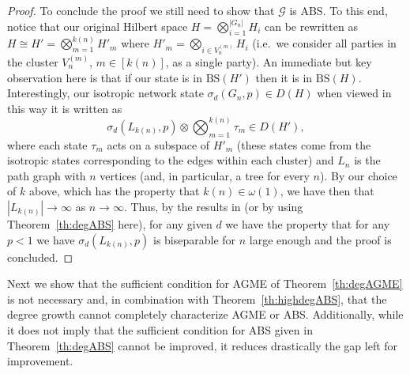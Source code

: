 \documentclass[a4paper,onecolumn,accepted=2024-12-14]{quantumarticle}
\theoremstyle{plain}
\newcommand{\cG}{{\mathcal G}}         %
\begin{document}
\begin{proof}
To conclude the proof we still need to show that $\cG$ is ABS. To this end, notice that our original Hilbert space $H=\bigotimes_{i=1}^{|G_n|} H_i$ can be rewritten as $H\cong H'=\bigotimes_{m=1}^{k(n)} H'_m$ where $H'_m=\bigotimes_{i\in V_n^{(m)}} H_i$ (i.e.\ we consider all parties in the cluster $V_n^{(m)}$, $m\in [k(n)]$, as a single party). An immediate but key observation here is that if our state is in $\mathrm{BS}(H')$ then it is in $\mathrm{BS}(H)$. Interestingly, our isotropic network state $\sigma_d(G_n,p)\in D(H)$ when viewed in this way it is written as
\begin{equation}
\sigma_d(L_{k(n)},p)\otimes\bigotimes_{m=1}^{k(n)}\tau_m\in D(H'),
\end{equation}
where each state $\tau_m$ acts on a subspace of $H'_m$ (these states come from the isotropic states corresponding to the edges within each cluster) and $L_n$ is the path graph with $n$ vertices (and, in particular, a tree for every $n$).
By our choice of $k$ above, which has the property that $k(n)\in\omega(1)$, we have then that $|L_{k(n)}|\to\infty$ as $n\to\infty$. Thus, by the results in \cite{ASGME} (or by using Theorem~\ref{th:degABS} here),
for any given $d$ we have the property that for any $p<1$ we have
$\sigma_d(L_{k(n)},p)$ is biseparable for $n$ large enough and the proof is concluded.
\end{proof}


Next we show that the sufficient condition for AGME of
Theorem~\ref{th:degAGME} is not necessary and, in combination with
Theorem~\ref{th:highdegABS}, that the degree growth cannot completely characterize AGME or ABS. Additionally, while it does not imply that the sufficient condition for ABS given in Theorem~\ref{th:degABS} cannot be improved, it reduces drastically the gap left for improvement. 
\end{document}
